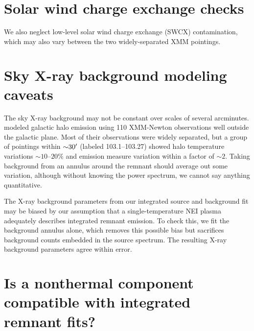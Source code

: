 \documentclass[preprint2,tighten,trackchanges]{aastex6}
\newcommand*{\abt}{\mathord{\sim}} %
\begin{document}
\clearpage  %
\appendix

\setcounter{table}{0}
\renewcommand{\thetable}{A\arabic{table}}
\setcounter{figure}{0}
\renewcommand{\thefigure}{A\arabic{figure}}

\section{Solar wind charge exchange checks}

We also neglect low-level solar wind charge exchange (SWCX) contamination,
which may also vary between the two widely-separated XMM pointings.


\section{Sky X-ray background modeling caveats}

The sky X-ray background may not be constant over scales of several arcminutes.
\citet{henley2013} modeled galactic halo emission using 110 XMM-Newton
observations well outside the galactic plane.
Most of their observations were widely separated, but a group of pointings
within $\abt 30\arcmin$ (labeled 103.1--103.27) showed halo temperature
variations $\abt 10$--$20\%$ and emission measure variation within a factor of
$\abt 2$.
Taking background from an annulus around the remnant should average out some
variation, although without knowing the power spectrum, we cannot say anything
quantitative.

The X-ray background parameters from our integrated source and background fit
may be biased by our assumption that a single-temperature NEI plasma adequately
describes integrated remnant emission.
To check this, we fit the background annulus alone, which removes this possible
bias but sacrifices background counts embedded in the source spectrum.
The resulting X-ray background parameters agree within error.

\clearpage
\section{Is a nonthermal component compatible with integrated remnant fits?}
\end{document}
